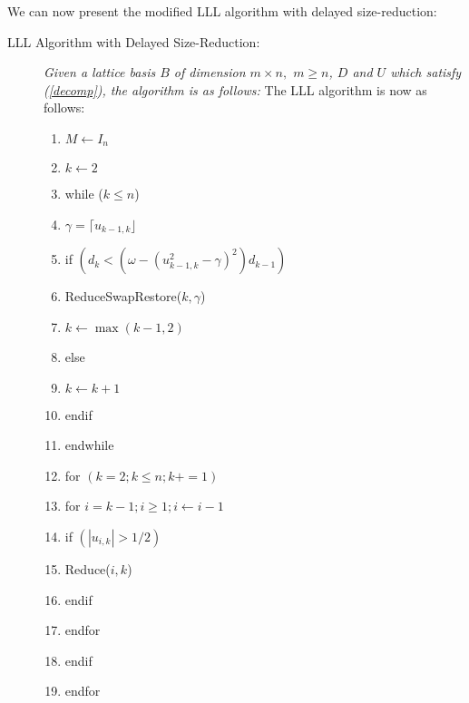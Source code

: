 \documentclass[12pt]{article}
\numberwithin{equation}{section}
\numberwithin{table}{section}
\numberwithin{figure}{section}
\begin{document}
We can now present the modified LLL algorithm with delayed size-reduction:
\begin{description}
\item[LLL Algorithm with Delayed Size-Reduction:] \textit{Given a lattice basis $B$ of dimension $m\times n,$ $m\geq n$, $D$ and $U$ which satisfy (\ref{decomp}), the algorithm is as follows:}
The LLL algorithm is now as follows\cite{LuoQiaoParallelLLL}:
\begin{enumerate}[1\hspace{.75em}]
\item $M\leftarrow I_n$
\item $k\leftarrow 2$
\item while ($k\leq n$)
\item \hspace{2em} $\gamma=\lceil u_{k-1,k} \rfloor $
\item \hspace{2em} if $\left(d_k<(\omega -(u^2_{k-1,k}-\gamma)^2)d_{k-1}\right)$
\item \hspace{2em}\hspace{2em} ReduceSwapRestore($k,\gamma$)
\item \hspace{2em}\hspace{2em} $k\leftarrow\max(k-1,2)$
\item \hspace{2em} else
\item \hspace{2em}\hspace{2em} $k\leftarrow k+1$
\item \hspace{2em} endif
\item endwhile
\item for $\left(k=2; k\leq n; k+=1\right)$
\item \hspace{2em}\hspace{2em} for $i=k-1; i \geq 1; i\leftarrow i-1$
\item \hspace{2em}\hspace{2em} \hspace{2em} if $\left(|u_{i,k}|>1/2\right)$
\item \hspace{2em}\hspace{2em} \hspace{2em} \hspace{2em} Reduce($i,k$)
\item \hspace{2em}\hspace{2em} \hspace{2em} endif
\item \hspace{2em}\hspace{2em} endfor
\item \hspace{2em} endif
\item endfor
\end{enumerate}
\end{description}
\end{document}
